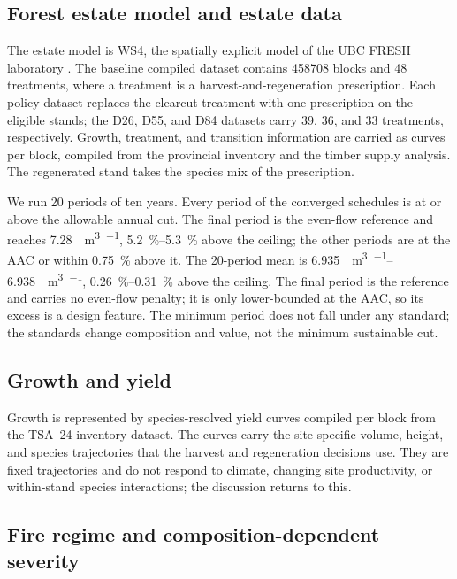 \subsection{Forest estate model and estate data}

The estate model is WS4, the spatially explicit model of the UBC FRESH laboratory
\citep{ubc_fresh_ws4_2026}. The baseline compiled dataset contains \num{458708} blocks
and 48 treatments, where a treatment is a harvest-and-regeneration prescription. Each policy dataset
replaces the clearcut treatment with one prescription on the eligible stands; the D26, D55, and D84 datasets carry 39, 36, and 33 treatments, respectively. Growth, treatment, and
transition information are carried as curves per block, compiled from the provincial inventory and
the timber supply analysis. The regenerated stand takes the species mix of the prescription.

We run 20 periods of ten years. Every period of the converged schedules is at or above the allowable annual cut. The final period is the even-flow reference and reaches
\SI{7.28}{\mega\cubic\meter\per\year}, \SIrange{5.2}{5.3}{\percent} above the ceiling; the
other periods are at the AAC or within \SI{0.75}{\percent} above it. The 20-period mean is
\SIrange{6.935}{6.938}{\mega\cubic\meter\per\year}, \SIrange{0.26}{0.31}{\percent} above the
ceiling. The final period is the reference and carries no even-flow penalty; it is only lower-bounded
at the AAC, so its excess is a design feature. The minimum period does not
fall under any standard; the standards change
composition and value, not the minimum sustainable cut.

\subsection{Growth and yield}

Growth is represented by species-resolved yield curves compiled per block from the TSA~24 inventory
dataset. The curves carry the site-specific volume, height, and species trajectories that the harvest and
regeneration decisions use. They are fixed trajectories and do not respond to climate,
changing site productivity, or within-stand species interactions; the discussion returns to this.

\subsection{Fire regime and composition-dependent severity}

